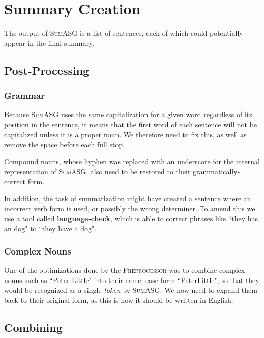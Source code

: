 \section{Summary Creation}
\label{sec:summary_creation}

The output of \textsc{SumASG} is a list of sentences, each of which could potentially appear in the final summary.

\subsection{Post-Processing}

\subsubsection{Grammar}

Because \textsc{SumASG} uses the same capitalization for a given word regardless of its position in the sentence, it means that the first word of each sentence will not be capitalized unless it is a proper noun. We therefore need to fix this, as well as remove the space before each full stop.

Compound nouns, whose hyphen was replaced with an underscore for the internal representation of \textsc{SumASG}, also need to be restored to their grammatically-correct form.

In addition, the task of summarization might have created a sentence where an incorrect verb form is used, or possibly the wrong determiner. To amend this we use a tool called \textbf{\href{https://pypi.org/project/language-check/}{language-check}}, which is able to correct phrases like ``they has an dog" to ``they have a dog".

\subsubsection{Complex Nouns}

One of the optimizations done by the \textsc{Preprocessor} was to combine complex nouns such as ``Peter Little" into their camel-case form ``PeterLittle", so that they would be recognized as a single \textit{token} by \textsc{SumASG}. We now need to expand them back to their original form, as this is how it should be written in English.

\subsection{Combining}

